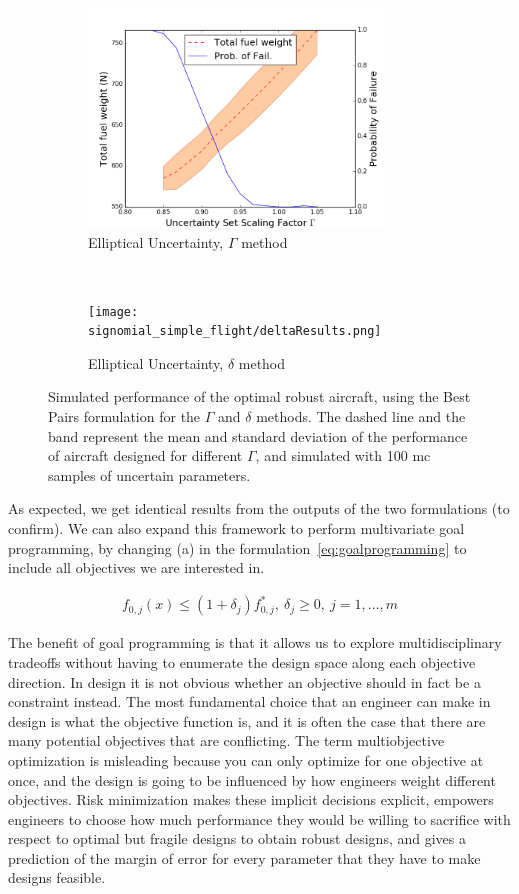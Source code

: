 \begin{figure}[ht]
    \centering
    \captionsetup{justification=centering, font=small}
    \begin{subfigure}{0.49\textwidth}
        \centering
        \includegraphics[height=2.3in]{signomial_simple_flight/ell_best_pairs.png}
         \caption{Elliptical Uncertainty, $\Gamma$ method}
    \end{subfigure}%
    ~
    \begin{subfigure}{0.49\textwidth}
        \centering
        \texttt{[image: signomial\_simple\_flight/deltaResults.png]}
         \caption{Elliptical Uncertainty, $\delta$ method}
    \end{subfigure}
    \caption{Simulated performance of the optimal robust aircraft, using the Best Pairs formulation
    for the $\Gamma$ and $\delta$ methods.
    The dashed line and the band represent the mean and standard deviation of the performance
    of aircraft designed for different $\Gamma$,
    and simulated with 100 \gls{mc} samples of uncertain parameters.}
    \label{fig:deltaVsGamma}
\end{figure}

As expected, we get identical results from the outputs of the two formulations (to confirm).
We can also expand this framework to perform multivariate goal programming,
by changing (a) in the formulation~\ref{eq:goalprogramming} to include all
objectives we are interested in.

\begin{align*}
    f_{0,j}(x) \leq (1+\delta_j) f^*_{0,j},~\delta_j \geq 0,~j = 1,\ldots, m
    \label{eq:multigoal}
\end{align*}

The benefit of goal programming is that it allows us to explore multidisciplinary tradeoffs without
having to enumerate the design space along each objective direction.
In design it is not obvious whether an objective should in fact be a constraint instead. The most
fundamental choice that an engineer can make in design is what the objective function is, and it is
often the case that there are many potential objectives that are conflicting. The term multiobjective optimization is misleading
because you can only optimize for one objective at once,
and the design is going to be influenced by how engineers weight different objectives.
Risk minimization makes these implicit decisions explicit, empowers engineers to choose
how much performance they would be willing to sacrifice with respect
to optimal but fragile designs to obtain robust designs, and gives a prediction of the margin of error
for every parameter that they have to make designs feasible.

